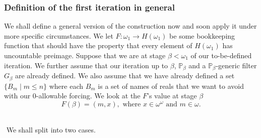 \documentclass[a4paper,11pt]{article}
\newcommand{\forceP}{\mathbb{P}}
\begin{document}
  \subsubsection{Definition of the first iteration in general}  
We shall define a general version of the construction now and soon apply it under more specific circumstances. 
    We let $F: \omega_1 \rightarrow H(\omega_1)$ be some bookkeeping function that should have the property that every element of $H(\omega_1)$ has uncountable preimage. Suppose that
    we are at stage $\beta < \omega_1$ of our to-be-defined iteration. We further assume that our iteration up to $\beta$, $\forceP_{\beta}$ and a $\forceP_{\beta}$-generic filter $G_{\beta}$ are already defined. We also assume that we have already defined a set $\{ B_m \mid m \le n \}$ where each $B_m$ is a set of names of reals that we want to avoid with our 0-allowable forcing. We look at the $F$'s value at stage $\beta$ 
    ﻿
    \[F(\beta) = (m,x), \text{ where }x \in \omega^{\omega} \text{ and }  m \in \omega. \]
    ﻿
   
    ﻿
    We shall split into two cases.
\end{document}

